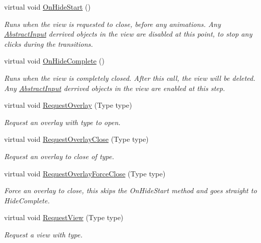 \begin{DoxyCompactItemize}
virtual void \hyperlink{class_scaffolding_1_1_abstract_view_ae8e198103d966b4a12bc8fdb27296765}{On\-Hide\-Start} ()
\begin{DoxyCompactList}\small\item\em Runs when the view is requested to close, before any animations. Any \hyperlink{class_scaffolding_1_1_abstract_input}{Abstract\-Input} derrived objects in the view are disabled at this point, to stop any clicks during the transitions. \end{DoxyCompactList}\item 
virtual void \hyperlink{class_scaffolding_1_1_abstract_view_aa5b29ad6a0a57677261e0bdc3b2e9825}{On\-Hide\-Complete} ()
\begin{DoxyCompactList}\small\item\em Runs when the view is completely closed. After this call, the view will be deleted. Any \hyperlink{class_scaffolding_1_1_abstract_input}{Abstract\-Input} derrived objects in the view are enabled at this step. \end{DoxyCompactList}\item 
virtual void \hyperlink{class_scaffolding_1_1_abstract_view_adfcc4c97dbec84c92718de4456717fc2}{Request\-Overlay} (Type type)
\begin{DoxyCompactList}\small\item\em Request an overlay with type to open. \end{DoxyCompactList}\item 
virtual void \hyperlink{class_scaffolding_1_1_abstract_view_a3b4879cd1667059f38599a7008d4fe61}{Request\-Overlay\-Close} (Type type)
\begin{DoxyCompactList}\small\item\em Request an overlay to close of type. \end{DoxyCompactList}\item 
virtual void \hyperlink{class_scaffolding_1_1_abstract_view_a5ad76f8f3445b4be40fe89a6e28d1d3b}{Request\-Overlay\-Force\-Close} (Type type)
\begin{DoxyCompactList}\small\item\em Force an overlay to close, this skips the On\-Hide\-Start method and goes straight to Hide\-Complete. \end{DoxyCompactList}\item 
virtual void \hyperlink{class_scaffolding_1_1_abstract_view_ac9e33d232d17e2815946bd7dfbdc718f}{Request\-View} (Type type)
\begin{DoxyCompactList}\small\item\em Request a view with type. \end{DoxyCompactList}\item 

\end{DoxyCompactItemize}
